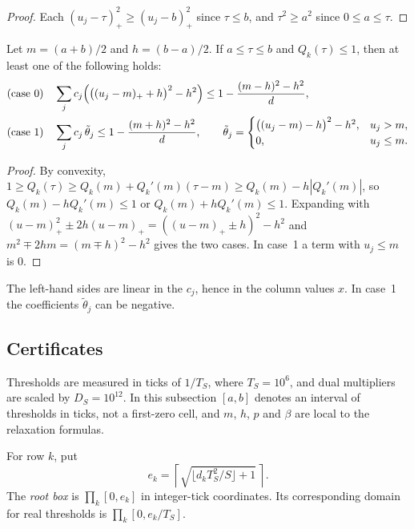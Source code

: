\documentclass[11pt]{amsart}
\numberwithin{equation}{section}
\theoremstyle{plain}
\theoremstyle{definition}
\theoremstyle{remark}
\newcommand{\1}{\mathbf{1}}
\begin{document}
\begin{proof}
Each $(u_j-\tau)_+^2\ge(u_j-b)_+^2$ since $\tau\le b$, and $\tau^2\ge a^2$ since $0\le a\le\tau$.
\end{proof}

\begin{lemma}\label{lem:tangent}
Let $m=(a+b)/2$ and $h=(b-a)/2$. If $a\le\tau\le b$ and $Q_k(\tau)\le1$, then at least one of
the following holds:
\begin{align*}
  \text{(case 0)}\quad&\sum_jc_j\Bigl(\bigl((u_j-m)_++h\bigr)^2-h^2\Bigr)\le
    1-\frac{(m-h)^2-h^2}{d},\\
  \text{(case 1)}\quad&\sum_jc_j\,\tilde\theta_j\le1-\frac{(m+h)^2-h^2}{d},\qquad
    \tilde\theta_j=\begin{cases}\bigl((u_j-m)-h\bigr)^2-h^2,&u_j>m,\\0,&u_j\le m.\end{cases}
\end{align*}
\end{lemma}

\begin{proof}
By convexity, $1\ge Q_k(\tau)\ge Q_k(m)+Q_k'(m)(\tau-m)\ge Q_k(m)-h|Q_k'(m)|$, so
$Q_k(m)-hQ_k'(m)\le1$ or $Q_k(m)+hQ_k'(m)\le1$. Expanding with
$(u-m)_+^2\pm2h(u-m)_+=((u-m)_+\pm h)^2-h^2$ and $m^2\mp2hm=(m\mp h)^2-h^2$ gives the two cases.
In case~1 a term with $u_j\le m$ is $0$.
\end{proof}

The left-hand sides are linear in the $c_j$, hence in the column values $x$. In case~1 the
coefficients $\tilde\theta_j$ can be negative.

\subsection{Certificates}
Thresholds are measured in ticks of $1/T_S$, where $T_S=10^6$, and dual multipliers are scaled
by $D_S=10^{12}$. In this subsection $[a,b]$ denotes an interval of thresholds in ticks, not a
first-zero cell, and $m$, $h$, $p$ and $\beta$ are local to the relaxation formulas.

\begin{definition}\label{def:rootbox}
For row $k$, put
\[
  e_k=\left\lceil\sqrt{\lfloor d_kT_S^2/S\rfloor+1}\,\right\rceil.
\]
The \emph{root box} is $\prod_k[0,e_k]$ in integer-tick coordinates. Its corresponding
domain for real thresholds is $\prod_k[0,e_k/T_S]$.
\end{definition}
\end{document}
